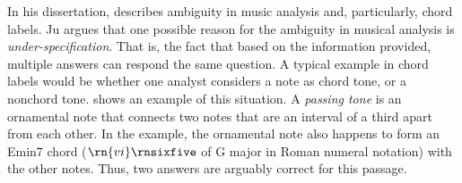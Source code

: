 

In his dissertation, \textcite{ju2021addressing} describes
ambiguity in music analysis and, particularly, chord labels.
Ju argues that one possible reason for the ambiguity in
musical analysis is \emph{under-specification}. That is, the
fact that based on the information provided, multiple
answers can respond the same question. A typical example in
chord labels would be whether one analyst considers a note
as chord tone, or a nonchord tone.  shows
an example of this situation. A \emph{passing tone} is an
ornamental note that connects two notes that are an interval
of a third apart from each other. In the example, the
ornamental note also happens to form an Emin7 chord
($\rn{vi}\rnsixfive$ of G major in Roman numeral notation)
with the other notes. Thus, two answers are arguably
correct for this passage.

